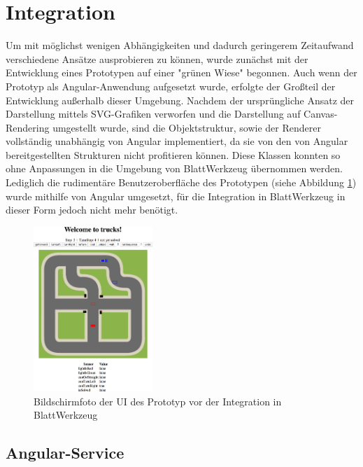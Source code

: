 \section{Integration}
\label{sec:implementation:integration}

Um mit möglichst wenigen Abhängigkeiten und dadurch geringerem Zeitaufwand verschiedene Ansätze ausprobieren zu können, wurde zunächst mit der Entwicklung eines Prototypen auf einer "grünen Wiese" begonnen. Auch wenn der Prototyp als Angular-Anwendung aufgesetzt wurde, erfolgte der Großteil der Entwicklung außerhalb dieser Umgebung. Nachdem der ursprüngliche Ansatz der Darstellung mittels SVG-Grafiken verworfen und die Darstellung auf Canvas-Rendering umgestellt wurde, sind die Objektstruktur, sowie der Renderer vollständig unabhängig von Angular implementiert, da sie von den von Angular bereitgestellten Strukturen nicht profitieren können. Diese Klassen konnten so ohne Anpassungen in die Umgebung von BlattWerkzeug übernommen werden. Lediglich die rudimentäre Benutzeroberfläche des Prototypen (siehe Abbildung \ref{fig:implementation:integration:prototype}) wurde mithilfe von Angular umgesetzt, für die Integration in BlattWerkzeug in dieser Form jedoch nicht mehr benötigt.

\begin{figure}
  \centering
  \includegraphics[width=0.4\textwidth]{gfx/implementation-integration-prototype.png}
  \caption{Bildschirmfoto der UI des Prototyp vor der Integration in BlattWerkzeug}
  \label{fig:implementation:integration:prototype}
\end{figure}

\subsection{Angular-Service}
\label{sec:implementation:integration:ng-service}

